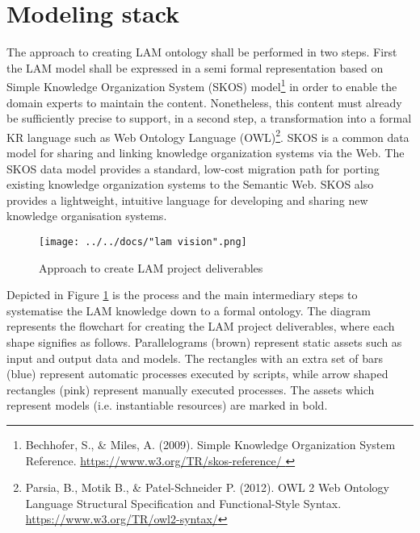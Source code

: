 
\section{Modeling stack}\label{ariaid-title134}

The approach to creating LAM ontology shall be performed in two steps. First the LAM model shall be expressed in a semi formal representation based on Simple Knowledge Organization System (SKOS) model\footnote{Bechhofer, S., \& 	Miles, A. (2009). Simple Knowledge Organization System Reference. \url{https://www.w3.org/TR/skos-reference/ }} in order to enable the domain experts to maintain the content. Nonetheless, this content must already be sufficiently precise to support, in a second step, a transformation into a formal KR language such as Web Ontology Language (OWL)\footnote{Parsia, B., Motik B.,  \& Patel-Schneider P. (2012). OWL 2 Web Ontology Language Structural Specification and Functional-Style Syntax. \url{https://www.w3.org/TR/owl2-syntax/}}. SKOS is a common data model for sharing and linking knowledge organization systems via the Web. The SKOS data model provides a standard, low-cost migration path for porting existing knowledge organization systems to the Semantic Web. SKOS also provides a lightweight, intuitive language for developing and sharing new knowledge organisation systems.

\begin{figure}[!ht]
	\centering
	\texttt{[image: ../../docs/"lam vision".png]}
	\caption{Approach to create LAM project deliverables}
	\label{fig:process-fig}
\end{figure}


Depicted in Figure \ref{fig:process-fig} is the process and the main intermediary steps to systematise the LAM knowledge down to a formal ontology. The diagram represents the flowchart for creating the LAM project deliverables, where each shape signifies as follows. Parallelograms (brown) represent static assets such as input and output data and models. The rectangles with an extra set of bars (blue) represent automatic processes executed by scripts, while arrow shaped rectangles (pink) represent manually executed processes. The assets which represent models (i.e. instantiable resources) are marked in bold. 


